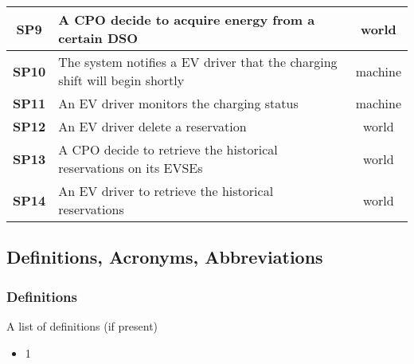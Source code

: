 \begin{table}[H]
\begin{tabularx}{\textwidth}{c|X|c}
        \textbf{SP9}  & A CPO decide to acquire energy from a certain DSO                                                                                                                     & world         \\ \midrule
        \textbf{SP10} & The system notifies a EV driver that the charging shift will begin shortly                                                                                            & machine       \\ \midrule
        \textbf{SP11} & An EV driver monitors the charging status                                                                                                                             & machine       \\ \midrule
        \textbf{SP12} & An EV driver delete a reservation                                                                                                                                     & world         \\ \midrule
        \textbf{SP13} & A CPO decide to retrieve the historical reservations on its EVSEs                                                                                                     & world         \\ \midrule
        \textbf{SP14} & An EV driver to retrieve the historical reservations                                                                                                                  & world         \\ \bottomrule
    \end{tabularx}
\end{table}


\subsection{Definitions, Acronyms, Abbreviations}
\subsubsection*{Definitions}
A list of definitions (if present)
\begin{itemize}
    \item 1
\end{itemize}
